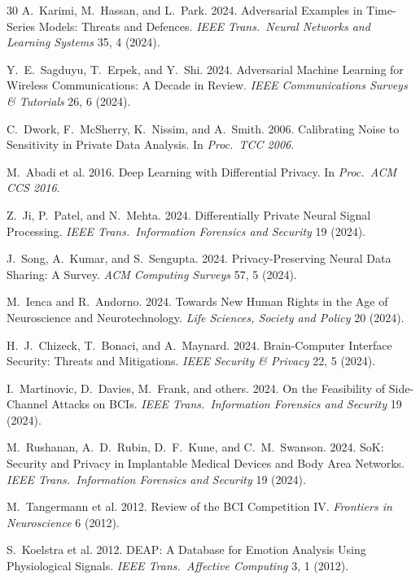 \documentclass[sigconf,nonacm]{acmart}
\begin{document}
\begin{thebibliography}{30}
A.~Karimi, M.~Hassan, and L.~Park. 2024. Adversarial Examples in
Time-Series Models: Threats and Defences.
\textit{IEEE Trans.\ Neural Networks and Learning Systems}
35, 4 (2024).

Y.~E.~Sagduyu, T.~Erpek, and Y.~Shi. 2024. Adversarial Machine
Learning for Wireless Communications: A Decade in Review.
\textit{IEEE Communications Surveys \& Tutorials} 26, 6 (2024).

C.~Dwork, F.~McSherry, K.~Nissim, and A.~Smith. 2006. Calibrating
Noise to Sensitivity in Private Data Analysis. In \textit{Proc.\
TCC 2006}.

M.~Abadi et al. 2016. Deep Learning with Differential Privacy.
In \textit{Proc.\ ACM CCS 2016}.

Z.~Ji, P.~Patel, and N.~Mehta. 2024. Differentially Private
Neural Signal Processing. \textit{IEEE Trans.\ Information Forensics
and Security} 19 (2024).

J.~Song, A.~Kumar, and S.~Sengupta. 2024. Privacy-Preserving
Neural Data Sharing: A Survey.
\textit{ACM Computing Surveys} 57, 5 (2024).

M.~Ienca and R.~Andorno. 2024. Towards New Human Rights in the
Age of Neuroscience and Neurotechnology.
\textit{Life Sciences, Society and Policy} 20 (2024).

H.~J.~Chizeck, T.~Bonaci, and A.~Maynard. 2024. Brain-Computer
Interface Security: Threats and Mitigations.
\textit{IEEE Security \& Privacy} 22, 5 (2024).

I.~Martinovic, D.~Davies, M.~Frank, and others. 2024. On the
Feasibility of Side-Channel Attacks on BCIs.
\textit{IEEE Trans.\ Information Forensics and Security} 19 (2024).

M.~Rushanan, A.~D.~Rubin, D.~F.~Kune, and C.~M.~Swanson. 2024.
SoK: Security and Privacy in Implantable Medical Devices and
Body Area Networks. \textit{IEEE Trans.\ Information Forensics
and Security} 19 (2024).

M.~Tangermann et al. 2012. Review of the BCI Competition IV.
\textit{Frontiers in Neuroscience} 6 (2012).

S.~Koelstra et al. 2012. DEAP: A Database for Emotion Analysis
Using Physiological Signals. \textit{IEEE Trans.\ Affective
Computing} 3, 1 (2012).


\end{thebibliography}
\end{document}

